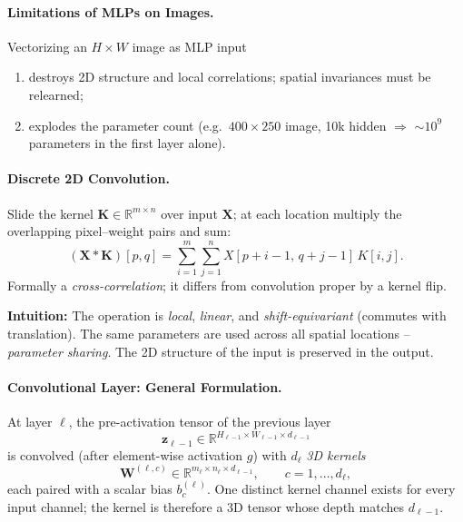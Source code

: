 \documentclass{article}
\begin{document}
\paragraph{Limitations of MLPs on Images.}
Vectorizing an $H \times W$ image as MLP input
\begin{enumerate}
    \item destroys 2D structure and local correlations; spatial invariances must be relearned;
    \item explodes the parameter count (e.g.\ $400\!\times\!250$ image, 10k hidden $\Rightarrow$ $\sim\!10^9$ parameters in the first layer alone).
\end{enumerate}

\paragraph{Discrete 2D Convolution.}
Slide the kernel $\mathbf{K} \in \mathbb{R}^{m \times n}$ over input $\mathbf{X}$; at each location multiply the overlapping pixel--weight pairs and sum:
\begin{equation*}
    (\mathbf{X} * \mathbf{K})[p, q] = \sum_{i=1}^{m} \sum_{j=1}^{n} X[p+i-1,\, q+j-1]\, K[i, j].
\end{equation*}
Formally a \textit{cross-correlation}; it differs from convolution proper by a kernel flip.

\textbf{Intuition:} The operation is \textit{local}, \textit{linear}, and \textit{shift-equivariant} (commutes with translation). The same parameters are used across all spatial locations -- \textit{parameter sharing}. The 2D structure of the input is preserved in the output.

\paragraph{Convolutional Layer: General Formulation.}
At layer $\ell$, the pre-activation tensor of the previous layer
\begin{equation*}
    \mathbf{z}_{\ell-1} \in \mathbb{R}^{H_{\ell-1} \times W_{\ell-1} \times d_{\ell-1}}
\end{equation*}
is convolved (after element-wise activation $g$) with $d_\ell$ \textit{3D kernels}
\begin{equation*}
    \mathbf{W}^{(\ell, c)} \in \mathbb{R}^{m_\ell \times n_\ell \times d_{\ell-1}}, \qquad c = 1, \dots, d_\ell,
\end{equation*}
each paired with a scalar bias $b_c^{(\ell)}$. One distinct kernel channel exists for every input channel; the kernel is therefore a 3D tensor whose depth matches $d_{\ell-1}$.
\end{document}
